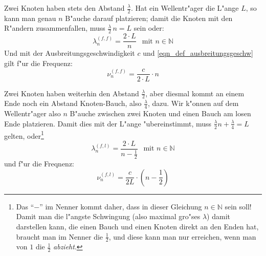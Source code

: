 \begin{description}[\setlabelstyle{\bfseries\slshape}]
\item[Zwei feste Enden] Zwei Knoten haben stets den Abstand
   $\frac{\lambda}{2}$. Hat ein Wellentr"ager die L"ange $L$, so kann
   man genau $n$ B"auche darauf platzieren; damit die Knoten mit den
   R"andern zusammenfallen, muss $\frac{\lambda}{2}\, n = L$ sein oder:
   \begin{equation}
      \label{eq:153}
      \lambda_n^{(f,f)} = \frac{2\cdot L}{n} ~  ~ \text{ mit } n \in
      \mathbb N
   \end{equation}
Und mit der Ausbreitungsgeschwindigkeit $c$ und
\eqref{eqn_def_ausbreitungsgeschw} gilt f"ur die Frequenz:
\begin{equation}
   \label{eq:154}
   \nu_n^{(f,f)} = \frac{c}{2\cdot L} \cdot n
\end{equation}


\item[Ein festes und ein loses Ende] Zwei Knoten haben weiterhin den
   Abstand $\frac{\lambda}{2}$, aber diesmal kommt an einem Ende noch
   ein Abstand Knoten-Bauch, also $\frac{\lambda}{4}$, dazu.  Wir
   k"onnen auf dem Wellentr"ager also $n$ B"auche zwischen zwei Knoten
   und einen Bauch am losen Ende platzieren. Damit dies mit der L"ange
   "ubereinstimmt, muss $\frac{\lambda}{2}n + \frac{\lambda}{4} = L$
   gelten, oder\footnote{Das "`$-$"' im Nenner kommt daher, dass in
     dieser Gleichung $n\in \mathbb N$ sein soll! Damit man die
     l"angste Schwingung (also maximal gro"ses $\lambda$) damit
     darstellen kann, die einen Bauch und einen Knoten direkt an den
     Enden hat, braucht man im Nenner die $\frac{1}{2}$, und diese
     kann man nur erreichen, wenn man von $1$ die $\frac{1}{2}$
     \emph{abzieht}.}
   \begin{equation}
      \label{eq:162}
      \lambda_n^{(f,l)} = \frac{2 \cdot L}{n - \frac{1}{2}} ~  ~
      \text{ mit } n
      \in \mathbb N
   \end{equation}
und f"ur die Freqnenz:
\begin{equation}
   \label{eq:163}
   \nu_n^{(f,l)} = \frac{c}{2L} \cdot (n - \frac{1}{2} )
\end{equation}
\end{description}



